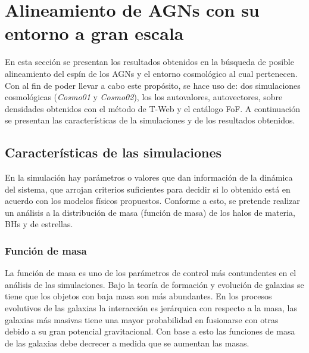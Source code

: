 \begin{savequote}[50mm]
\end{savequote}




\chapter{Alineamiento de AGNs con su entorno a gran escala}
\label{cha:cosmic_web}

En esta sección se presentan los resultados obtenidos en la búsqueda de posible alineamiento del espín de los AGNs y el entorno cosmológico al cual pertenecen. Con al fin de poder llevar a cabo este propósito, se hace uso de: dos simulaciones cosmológicas ({\it{Cosmo01}} y {\it{Cosmo02}}), los los autovalores, autovectores, sobre densidades obtenidos con el método de T-Web y el catálogo FoF. A continuación se presentan las características de la simulaciones y de los resultados obtenidos.

\section{Características de las simulaciones}
\label{sec: propiedades en las simulaciones}

En la simulación hay parámetros o valores que dan información de la dinámica del sistema,  que arrojan criterios suficientes para decidir si lo obtenido está en acuerdo con los modelos físicos propuestos. 
Conforme a esto, se pretende realizar un análisis a la distribución de masa (función de masa) de los halos de materia, BHs y de estrellas. 

\subsection{ Función de masa}
\label{subsec: funcion de masa}
La función de masa es uno de los parámetros de control más contundentes en el análisis de las simulaciones. Bajo la teoría de formación y evolución de galaxias se tiene que los objetos con baja masa son más abundantes. En los procesos evolutivos de las galaxias la interacción es jerárquica con respecto a la masa, las galaxias más masivas tiene una mayor probabilidad en fusionarse con otras debido a su gran potencial gravitacional. Con base a esto las funciones de masa de las galaxias debe decrecer a medida que se aumentan las masas. 

